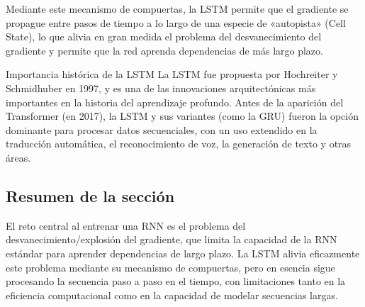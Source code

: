 Mediante este mecanismo de compuertas, la LSTM permite que el gradiente se propague entre pasos de tiempo a lo largo de una especie de «autopista» (Cell State), lo que alivia en gran medida el problema del desvanecimiento del gradiente y permite que la red aprenda dependencias de más largo plazo.

\begin{knowledgebox}{Importancia histórica de la LSTM}
La LSTM fue propuesta por Hochreiter y Schmidhuber en 1997, y es una de las innovaciones arquitectónicas más importantes en la historia del aprendizaje profundo. Antes de la aparición del Transformer (en 2017), la LSTM y sus variantes (como la GRU) fueron la opción dominante para procesar datos secuenciales, con un uso extendido en la traducción automática, el reconocimiento de voz, la generación de texto y otras áreas.
\end{knowledgebox}

\subsection{Resumen de la sección}

El reto central al entrenar una RNN es el problema del desvanecimiento/explosión del gradiente, que limita la capacidad de la RNN estándar para aprender dependencias de largo plazo. La LSTM alivia eficazmente este problema mediante su mecanismo de compuertas, pero en esencia sigue procesando la secuencia paso a paso en el tiempo, con limitaciones tanto en la eficiencia computacional como en la capacidad de modelar secuencias largas.

\newpage
